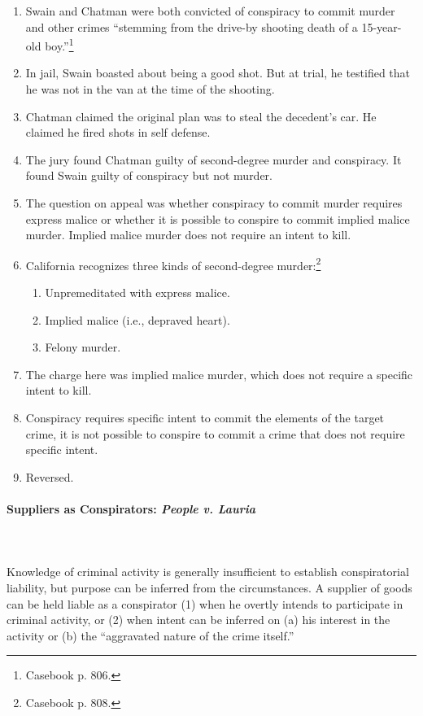 \begin{enumerate}
    \item Swain and Chatman were both convicted of conspiracy to commit murder 
    and other crimes ``stemming from the drive-by shooting death of a 
    15-year-old boy.''\footnote{Casebook p. 806.}
    \item In jail, Swain boasted about being a good shot. But at trial, he 
    testified that he was not in the van at the time of the shooting.
    \item Chatman claimed the original plan was to steal the decedent's car.  
    He claimed he fired shots in self defense.
    \item The jury found Chatman guilty of second-degree murder and 
    conspiracy. It found Swain guilty of conspiracy but not murder.
    \item The question on appeal was whether conspiracy to commit murder 
    requires express malice or whether it is possible to conspire to commit 
    implied malice murder. Implied malice murder does not require an intent to 
    kill.
    \item California recognizes three kinds of second-degree 
    murder:\footnote{Casebook p. 808.}
    \begin{enumerate}
        \item Unpremeditated with express malice.
        \item Implied malice (i.e., depraved heart).
        \item Felony murder.
    \end{enumerate}
    \item The charge here was implied malice murder, which does not require a 
    specific intent to kill.
    \item Conspiracy requires specific intent to commit the elements of the 
    target crime, it is not possible to conspire to commit a crime that does 
    not require specific intent.
    \item Reversed.
\end{enumerate}

\paragraph{Suppliers as Conspirators: \emph{People v. Lauria}}
~\\\\
Knowledge of criminal activity is generally insufficient to establish 
conspiratorial liability, but purpose can be inferred from the circumstances.
A supplier of goods can be held liable as a conspirator (1) when he overtly 
intends to participate in criminal activity, or (2) when intent can be 
inferred on (a) his interest in the activity or (b) the ``aggravated nature of 
the crime itself.''

